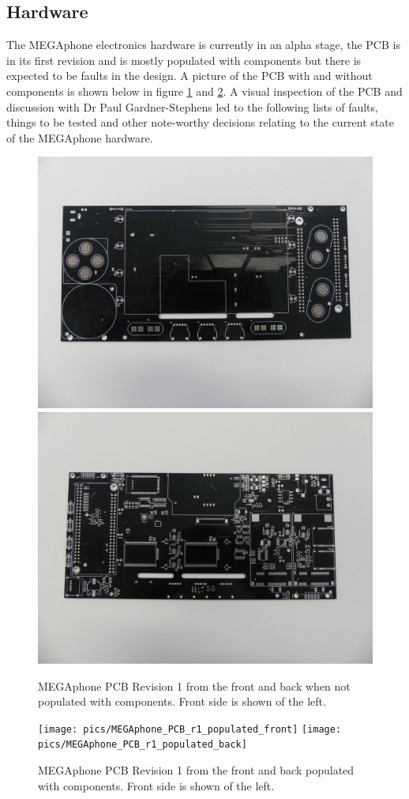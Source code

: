 \subsection{Hardware}
The MEGAphone electronics hardware is currently in an alpha stage, the PCB is in its first revision and is mostly populated with components but there is expected to be faults in the design. A picture of the PCB with and without components is shown below in figure \ref{MEGAphone_PCB_r1_empty} and \ref{MEGAphone_PCB_r1_populated}. A visual inspection of the PCB and discussion with Dr Paul Gardner-Stephens led to the following lists of faults, things to be tested and other note-worthy decisions relating to the current state of the MEGAphone hardware. \\

\begin{figure} \begin{center}
\includegraphics[width=.3\linewidth]{pics/MEGAphone_PCB_r1_empty_front} 
\includegraphics[width=.3\linewidth]{pics/MEGAphone_PCB_r1_empty_back} 
\end{center} 
\caption{MEGAphone PCB Revision 1 from the front and back when not populated with components. Front side is shown of the left.\\}
\label{MEGAphone_PCB_r1_empty}
\end{figure}

\begin{figure} \begin{center}
\texttt{[image: pics/MEGAphone\_PCB\_r1\_populated\_front]} 
\texttt{[image: pics/MEGAphone\_PCB\_r1\_populated\_back]} 
\end{center} 
\caption{MEGAphone PCB Revision 1 from the front and back populated with components. Front side is shown of the left.\\}
\label{MEGAphone_PCB_r1_populated}
\end{figure}


